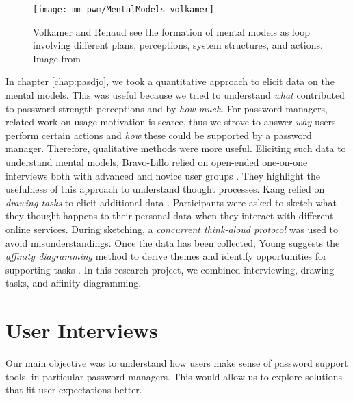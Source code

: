 \begin{figure}
	\centering
	\texttt{[image: mm\_pwm/MentalModels-volkamer]}
	\caption{\label{fig:mm_pwm:mental-model-volkamer} Volkamer and Renaud see the formation of mental models as loop involving different plans, perceptions, system structures, and actions. Image from \cite{Volkamer2013MentalModels}}
\end{figure}
In chapter \ref{chap:pasdjo}, we took a quantitative approach to elicit data on the mental models. This was useful because we tried to understand \textit{what} contributed to password strength perceptions and by \textit{how much}. For password managers, related work on usage motivation is scarce, thus we strove to answer \textit{why} users perform certain actions and \textit{how} these could be supported by a password manager. Therefore, qualitative methods were more useful. 
Eliciting such data to understand mental models, Bravo-Lillo \etal relied on open-ended one-on-one interviews both with advanced and novice user groups \cite{BravoLillo2011WarningsMentalModel}. They highlight the usefulness of this approach to understand thought processes. Kang \etal relied on \textit{drawing tasks} to elicit additional data \cite{Kang2015MentalModelsDrawing}. Participants were asked to sketch what they thought happens to their personal data when they interact with different online services. During sketching, a \textit{concurrent think-aloud protocol} was used to avoid misunderstandings. Once the data has been collected, Young suggests the \textit{affinity diagramming} method to derive themes and identify opportunities for supporting tasks \cite{Young2008}. In this research project, we combined interviewing, drawing tasks, and affinity diagramming. 

\section{User Interviews}
Our main objective was to understand how users make sense of password support tools, in particular password managers. This would allow us to explore solutions that fit user expectations better.  

